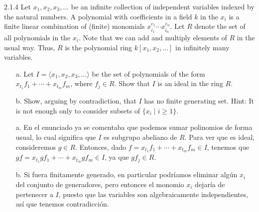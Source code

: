\documentclass[twoside]{article}
\begin{document}
\begin{ejercicio}{2.1.4}
Let $x_1, x_2, x_3,\dots$  be an infinite collection of independent variables indexed by the natural
numbers. A polynomial with coefficients in a field $k$ in the $x_i$ is a finite linear combination
of (finite) monomials $x^{e_1}_{i_1}\cdots x^{e_n}_{i_n}$. Let $R$ denote the set of all polynomials in the $x_i$. Note that
we can add and multiply elements of $R$ in the usual way. Thus, $R$ is the polynomial ring
$k[x_1, x_2,\dots]$ in infinitely many variables.
\begin{enumerate}[a.] 
\item[a.] Let $I = 
\langle x_1, x_2, x_3,\dotsc\rangle$ be the set of polynomials of the form $x_{t_1} f_1+\cdots+x_{t_m} f_m$, where
$f_j ∈ R$. Show that $I$ is an ideal in the ring $R$.
\item[b.] Show, arguing by contradiction, that $I$ has no finite generating set. Hint: It is not enough
only to consider subsets of $\{x_i \mid i ≥ 1\}$.
\end{enumerate}
\end{ejercicio}
\begin{solucion}
\begin{enumerate}[a.]
\item[]
\item[a.] En el enunciado ya se comentaba que podemos sumar polinomios de forma usual, lo cual significa que $I$ es subgrupo abeliano de $R$. Para ver que es ideal, consideremos $g\in R$. Entonces, dado $f= x_{t_1} f_1+\cdots+x_{t_m} f_m\in I$, tenemos que $gf=x_{t_1}g f_1+\cdots+x_{t_m}g f_m\in I$, ya que $gf_j\in R$. 
\item[b.] Si fuera finitamente generado, en particular podríamos eliminar algún $x_i$ del conjunto de generadores, pero entonces el monomio $x_i$ dejaría de pertenecer a $I$, puesto que las variables son algebraicamente independientes, así que tenemos contradicción. 
\end{enumerate}
\end{solucion}
\newpage
\end{document}
